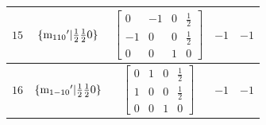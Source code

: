 \documentclass[fleqn,8pt]{jsarticle}
\begin{document}
\begin{longtable}{ccccc}
$ 15 $ & $ \{{\rm m}_{110}{}'|\frac{1}{2} \frac{1}{2} 0\} $ & $ \begin{bmatrix} 0 & -1 & 0 & \frac{1}{2} \\ -1 & 0 & 0 & \frac{1}{2} \\ 0 & 0 & 1 & 0 \end{bmatrix} $ & $ -1 $ & $ -1 $ \\ \hline
$ 16 $ & $ \{{\rm m}_{1-10}{}'|\frac{1}{2} \frac{1}{2} 0\} $ & $ \begin{bmatrix} 0 & 1 & 0 & \frac{1}{2} \\ 1 & 0 & 0 & \frac{1}{2} \\ 0 & 0 & 1 & 0 \end{bmatrix} $ & $ -1 $ & $ -1 $ \\
\end{longtable}
\end{document}
